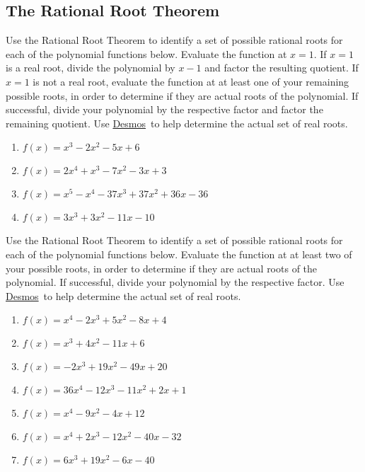\documentclass[12pt]{book}
\theoremstyle{definition}
\newcommand{\Desmos}{\href{https://www.desmos.com/}{Desmos}}
\begin{document}
\subsection*{The Rational Root Theorem}
Use the Rational Root Theorem to identify a set of possible rational roots for each of the polynomial functions below.  Evaluate the function at $x=1$.  If $x=1$ is a real root, divide the polynomial by $x-1$ and factor the resulting quotient.  If $x=1$ is not a real root, evaluate the function at at least one of your remaining possible roots, in order to determine if they are actual roots of the polynomial.  If successful, divide your polynomial by the respective factor and factor the remaining quotient.  Use \Desmos \ to help determine the actual set of real roots.
\begin{enumerate}
	\item $f(x) = x^{3} - 2x^{2} - 5x + 6$
	\item $f(x) = 2x^4+x^3-7x^2-3x+3$
	\item $f(x) = x^5-x^4-37x^3+37x^2+36x-36$
	\item $f(x) = 3x^{3} + 3x^{2} - 11x - 10$
\end{enumerate}
Use the Rational Root Theorem to identify a set of possible rational roots for each of the polynomial functions below.  Evaluate the function at at least two of your possible roots, in order to determine if they are actual roots of the polynomial.  If successful, divide your polynomial by the respective factor.  Use \Desmos \ to help determine the actual set of real roots.
\begin{enumerate}[resume]
	\item $f(x) = x^{4} -2x^3+ 5x^{2} - 8x + 4$
	\item $f(x) = x^{3} + 4x^{2} - 11x + 6$
	\item $f(x) = -2x^{3} + 19x^{2} - 49x + 20$
	\item $f(x) = 36x^{4} - 12x^{3} - 11x^{2} + 2x + 1$
	\item $f(x) = x^{4} - 9x^{2} - 4x + 12$
	\item $f(x) = x^{4} + 2x^{3} - 12x^{2} - 40x - 32$
	\item $f(x) = 6x^3+19x^2-6x-40$
\end{enumerate}
\end{document}
